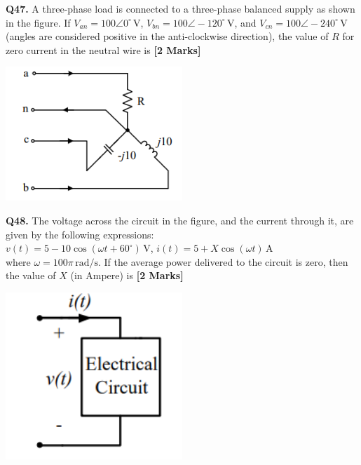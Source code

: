 \documentclass[11pt]{article}
\newcommand{\questionb}[2]{
    \noindent\textbf{Q#2.} #1 \hfill \textbf{[2 Marks]}
}
\begin{document}
\questionb{A three-phase load is connected to a three-phase balanced supply as shown in the figure. If \( V_{an} = 100\angle 0^\circ \, \text{V} \), \( V_{bn} = 100\angle -120^\circ \, \text{V} \), and \( V_{cn} = 100\angle -240^\circ \, \text{V} \) (angles are considered positive in the anti-clockwise direction), the value of \( R \) for zero current in the neutral wire is}{47}
\begin{center}
\includegraphics[width=0.5\textwidth]{figures/47.png}
\end{center}
\vspace{0.5cm}

\questionb{The voltage across the circuit in the figure, and the current through it, are given by the following expressions: \\
\( v(t) = 5 - 10 \cos(\omega t + 60^\circ) \, \text{V} \), \quad \( i(t) = 5 + X \cos(\omega t) \, \text{A} \) \\
where \( \omega = 100\pi \, \text{rad/s} \). If the average power delivered to the circuit is zero, then the value of \( X \) (in Ampere) is}{48}
\begin{center}
\includegraphics[width=0.5\textwidth]{figures/48.png}
\end{center}
\vspace{0.5cm}
\end{document}
